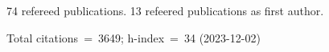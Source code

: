 74 refereed publications. 13 refeered publications as first author.

Total citations~=~3649; h-index~=~34 (2023-12-02)